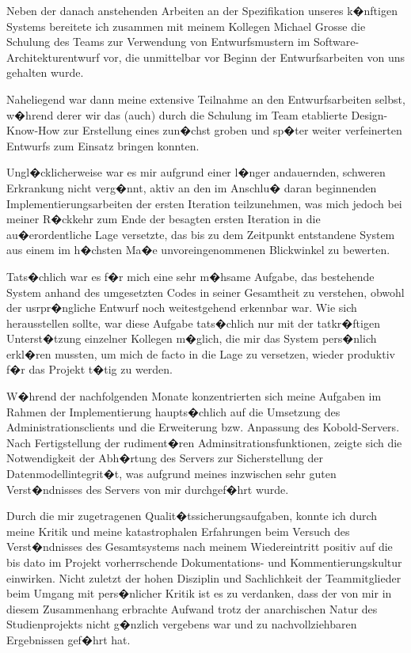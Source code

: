 \documentclass[a4paper,titlepage,12pt,ngerman]{scrbook}
\begin{document}
Neben der danach anstehenden Arbeiten an der Spezifikation unseres k�nftigen Systems 
bereitete ich zusammen mit meinem Kollegen Michael Grosse die Schulung des Teams zur
Verwendung von Entwurfsmustern im Software-Architekturentwurf vor, die unmittelbar vor 
Beginn der Entwurfsarbeiten von uns gehalten wurde.\par

Naheliegend war dann meine extensive Teilnahme an den Entwurfsarbeiten selbst, w�hrend 
derer wir das (auch) durch die Schulung im Team etablierte Design-Know-How zur Erstellung eines
zun�chst groben und sp�ter weiter verfeinerten Entwurfs zum Einsatz bringen konnten.\par

Ungl�cklicherweise war es mir aufgrund einer l�nger andauernden, schweren Erkrankung nicht verg�nnt,
aktiv an den im Anschlu� daran beginnenden Implementierungsarbeiten der ersten Iteration teilzunehmen,
was mich jedoch bei meiner R�ckkehr zum Ende der besagten ersten Iteration in die au�erordentliche Lage
versetzte, das bis zu dem Zeitpunkt entstandene System aus einem im h�chsten Ma�e unvoreingenommenen
Blickwinkel zu bewerten.\par

Tats�chlich war es f�r mich eine sehr m�hsame Aufgabe, das bestehende System anhand des umgesetzten Codes
in seiner Gesamtheit zu verstehen, obwohl der usrpr�ngliche Entwurf noch weitestgehend erkennbar war. Wie
sich herausstellen sollte, war diese Aufgabe tats�chlich nur mit der tatkr�ftigen Unterst�tzung einzelner 
Kollegen m�glich, die mir das System pers�nlich erkl�ren mussten, um mich de facto in die Lage zu versetzen, 
wieder produktiv f�r das Projekt t�tig zu werden.\par

W�hrend der nachfolgenden Monate konzentrierten sich meine Aufgaben im Rahmen der Implementierung haupts�chlich
auf die Umsetzung des Administrationsclients und die Erweiterung bzw. Anpassung des Kobold-Servers. Nach Fertigstellung
der rudiment�ren Adminsitrationsfunktionen, zeigte sich die Notwendigkeit der Abh�rtung des Servers zur Sicherstellung
der Datenmodellintegrit�t, was aufgrund meines inzwischen sehr guten Verst�ndnisses des Servers von mir durchgef�hrt wurde.\par

Durch die mir zugetragenen Qualit�tssicherungsaufgaben, konnte ich durch meine Kritik und meine katastrophalen Erfahrungen 
beim Versuch des Verst�ndnisses des Gesamtsystems nach meinem Wiedereintritt positiv auf die bis dato im Projekt vorherrschende 
Dokumentations- und Kommentierungskultur einwirken. Nicht zuletzt der hohen Disziplin und Sachlichkeit der Teammitglieder beim 
Umgang mit pers�nlicher Kritik ist es zu verdanken, dass der von mir in diesem Zusammenhang erbrachte Aufwand trotz der anarchischen
Natur des Studienprojekts nicht g�nzlich vergebens war und zu nachvollziehbaren Ergebnissen gef�hrt hat.\par
\end{document}
